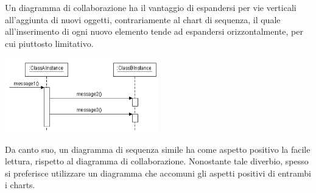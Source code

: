 \documentclass{article}
\begin{document}
Un diagramma di collaborazione ha il vantaggio di espandersi per vie verticali all'aggiunta di nuovi oggetti, contrariamente al chart di sequenza, il quale all'inserimento di ogni nuovo elemento tende ad espandersi orizzontalmente, per cui piuttosto limitativo.\vspace*{14pt}
\begin{center}
    \includegraphics[width=0.5\textwidth]{foto 2.png}
\end{center}
Da canto suo, un diagramma di sequenza simile ha come aspetto positivo la facile lettura, rispetto al diagramma di collaborazione. Nonostante tale diverbio, spesso si preferisce utilizzare un diagramma che accomuni gli aspetti positivi di entrambi i charts.
\end{document}
